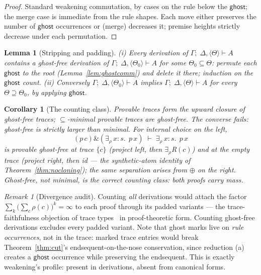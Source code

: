 \documentclass[11pt]{article}
\newcommand{\addconj}{\mathbin{\&}}              %
\newcommand{\adddisj}{\oplus}                    %
\newcommand{\erho}[2]{\exists_{\rho}\, #1{:}#2.\;} %
\newcommand{\trz}[1]{\langle #1\rangle}            %
\newcommand{\Tr}{\Theta}                           %
\newcommand{\ghost}{\mathsf{ghost}}
\newcommand{\seq}[3]{#1;\;#2\vdash #3}             %
\newtheorem{lemma}[theorem]{Lemma}
\newtheorem{corollary}[theorem]{Corollary}
\theoremstyle{definition}
\theoremstyle{remark}
\newtheorem{remark}[theorem]{Remark}
\begin{document}
\begin{proof}
Standard weakening commutation, by cases on the rule below the
$\ghost$; the merge case is immediate from the rule shapes.  Each move
either preserves the number of $\ghost$ occurrences or (merge)
decreases it; premise heights strictly decrease under each
permutation.
\end{proof}

\begin{lemma}[Stripping and padding]\label{lem:strip}
(i) Every derivation of $\seq{\Gamma}{\Delta,\trz\Tr}{A}$ contains a
ghost-free derivation of $\seq{\Gamma}{\Delta,\trz{\Tr_0}}{A}$ for some
$\Tr_0 \subseteq \Tr$: permute each $\ghost$ to the root
(Lemma~\ref{lem:ghostcomm}) and delete it there; induction on the
$\ghost$ count.
(ii) Conversely $\seq{\Gamma}{\Delta,\trz{\Tr_0}}{A}$ implies
$\seq{\Gamma}{\Delta,\trz{\Tr}}{A}$ for every $\Tr \supseteq \Tr_0$,
by applying $\ghost$.
\end{lemma}

\begin{corollary}[The counting class]\label{cor:countingclass}
Provable traces form the upward closure of ghost-free traces;
$\subseteq$-minimal provable traces are ghost-free.  The converse
fails: ghost-free is \emph{strictly} larger than minimal.  For
internal choice on the left,
\[
  (p\,c) \addconj (\erho{x}{s}\,p\,x) \;\vdash\; \erho{x}{s}\,p\,x
\]
is provable ghost-free at trace $\{c\}$ (project left, then
$\exists_\rho$R$(c)$) \emph{and} at the empty trace (project right,
then id --- the synthetic-atom identity of
Theorem~\ref{thm:nocloning}); the same separation arises from
$\adddisj$ on the right.  Ghost-free, not minimal, is the correct
counting class: both proofs carry mass.
\end{corollary}

\begin{remark}[Divergence audit]
Counting \emph{all} derivations would attach the factor
$\sum_k \big(\sum_c \rho(c)\big)^k = \infty$ to each proof through its
padded variants --- the trace-faithfulness objection of trace
types~\cite{LewPOPL2020} in proof-theoretic form.  Counting ghost-free
derivations excludes every padded variant.  Note that ghost marks live
on \emph{rule occurrences}, not in the trace: marked trace entries
would break Theorem~\ref{thm:cut}'s endsequent-on-the-nose
conservation, since reduction (a) creates a $\ghost$ occurrence while
preserving the endsequent.  This is exactly weakening's profile:
present in derivations, absent from canonical forms.
\end{remark}
\end{document}
